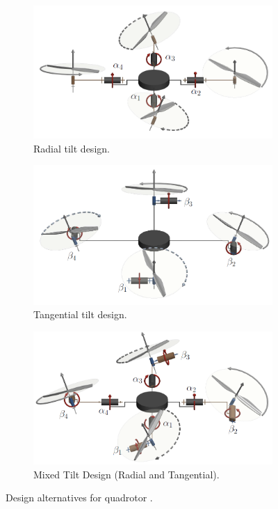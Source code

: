 \documentclass[a4paper, 12pt, oneside]{book}
\begin{document}
\begin{figure}[H]
\centering
\begin{subfigure}{.49\textwidth}
  \centering
  \includegraphics[width=.99\linewidth]{figures/radial_UAV.PNG}
  \caption{Radial tilt design.}
  \label{fig:radial_UAV}
\end{subfigure}
\begin{subfigure}{.49\textwidth}
  \centering
  \includegraphics[width=.99\linewidth]{figures/tangential_UAV.PNG}
  \caption{Tangential tilt design.}
  \label{fig:tangential_UAV}
\end{subfigure}
\begin{subfigure}{.49\textwidth}
  \centering
  \includegraphics[width=.99\linewidth]{figures/mixed_UAV.PNG}
  \caption{Mixed Tilt Design (Radial and Tangential).}
  \label{fig:mixed_UAV}
\end{subfigure}
\caption{Design alternatives for quadrotor \cite{hamandi2020survey}.}
\label{fig:patch_extraction}
\end{figure}
\end{document}
